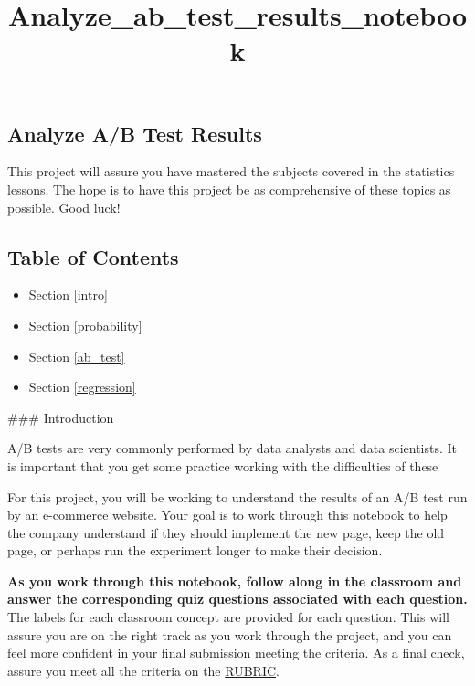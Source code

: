 \documentclass[11pt]{article}
\title{Analyze\_ab\_test\_results\_notebook}
\providecommand{\tightlist}{%
      \setlength{\itemsep}{0pt}\setlength{\parskip}{0pt}}
\begin{document}
    
    
    \maketitle
    
    

    
    \subsection{Analyze A/B Test Results}\label{analyze-ab-test-results}

This project will assure you have mastered the subjects covered in the
statistics lessons. The hope is to have this project be as comprehensive
of these topics as possible. Good luck!

\subsection{Table of Contents}\label{table-of-contents}

\begin{itemize}
\tightlist
\item
  Section \ref{intro}
\item
  Section \ref{probability}
\item
  Section \ref{ab_test}
\item
  Section \ref{regression}
\end{itemize}

 \#\#\# Introduction

A/B tests are very commonly performed by data analysts and data
scientists. It is important that you get some practice working with the
difficulties of these

For this project, you will be working to understand the results of an
A/B test run by an e-commerce website. Your goal is to work through this
notebook to help the company understand if they should implement the new
page, keep the old page, or perhaps run the experiment longer to make
their decision.

\textbf{As you work through this notebook, follow along in the classroom
and answer the corresponding quiz questions associated with each
question.} The labels for each classroom concept are provided for each
question. This will assure you are on the right track as you work
through the project, and you can feel more confident in your final
submission meeting the criteria. As a final check, assure you meet all
the criteria on the
\href{https://review.udacity.com/\#!/projects/37e27304-ad47-4eb0-a1ab-8c12f60e43d0/rubric}{RUBRIC}.
\end{document}

